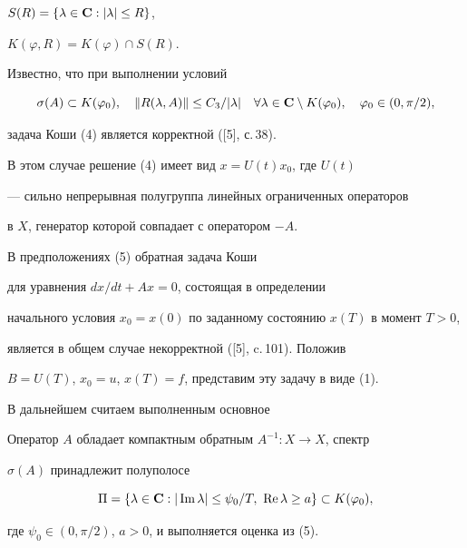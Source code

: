 $S(R)=\{\lambda\in{\bold C}: |\lambda| \leq R \}$, 


$K(\varphi, R) = K(\varphi)\cap S(R)$.


Известно, что при выполнении условий


\begin{equation}


\sigma(A)\subset K(\varphi_0),\quad


\| R(\lambda, A)\| \leq C_3/|\lambda|


\quad\forall\lambda\in{\bold C}\setminus K(\varphi_0),


\quad \varphi_0\in (0,\pi/2),


\end{equation}


задача Коши (4) является корректной ([5], с.\,38).


В этом случае решение (4) имеет вид $x = U(t) x_0$, где $U(t)$


--- сильно непрерывная полугруппа линейных ограниченных операторов 


в $X$, генератор которой совпадает с оператором $-A$.


В предположениях (5) обратная задача Коши


для уравнения $dx/dt +Ax = 0$, состоящая в определении


начального условия $x_0=x(0)$ по заданному состоянию $x(T)$ в момент $T>0$,


является в общем случае некорректной ([5], c.\,101). Положив


$B=U(T)$, $x_0=u$, $x(T)=f$, представим эту задачу в виде (1).





В дальнейшем считаем выполненным основное 





\begin{cond}


Оператор $A$ обладает компактным обратным $A^{-1}:X\to X$, спектр


$\sigma(A)$ принадлежит полуполосе


$$


\Pi = \{\lambda\in{\bold C}: | \im


\lambda | \leq \psi_0/T,\ \re\lambda \geq a \}\subset K(\varphi_0),


$$


где $\psi_0\in(0, \pi/2)$, $a>0$, и выполняется оценка из (5).


\end{cond}





